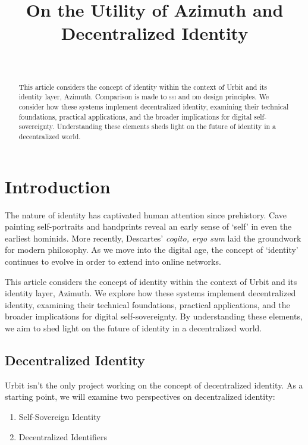 \documentclass[twoside]{article}
\title{On the Utility of Azimuth and Decentralized Identity}
\author{\authorname~\authorpatp \\ \affiliation}
\date{}
\begin{document}
\maketitle
\thispagestyle{firststyle}

\begin{abstract}
  This article considers the concept of identity within the context of Urbit and its identity layer, Azimuth.  Comparison is made to \textsc{ssi} and \textsc{did} design principles.  We consider how these systems implement decentralized identity, examining their technical foundations, practical applications, and the broader implications for digital self-sovereignty.  Understanding these elements sheds light on the future of identity in a decentralized world.
\end{abstract}

\setcounter{page}{9}

\tableofcontents

\section{Introduction}

The nature of identity has captivated human attention since prehistory. Cave painting self-portraits and handprints reveal an early sense of `self' in even the earliest hominids. More recently, Descartes' \emph{cogito, ergo sum} laid the groundwork for modern philosophy. As we move into the digital age, the concept of `identity' continues to evolve in order to extend into online networks.

This article considers the concept of identity within the context of Urbit and its identity layer, Azimuth. We explore how these systems implement decentralized identity, examining their technical foundations, practical applications, and the broader implications for digital self-sovereignty. By understanding these elements, we aim to shed light on the future of identity in a decentralized world.

\subsection{Decentralized Identity}

Urbit isn't the only project working on the concept of decentralized identity. As a starting point, we will examine two perspectives on decentralized identity:

\begin{enumerate}
  \item Self-Sovereign Identity
  \item Decentralized Identifiers
\end{enumerate}
\end{document}
